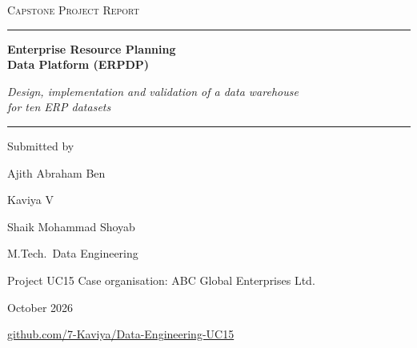 \documentclass[12pt,a4paper]{report}
\newcommand{\institution}{}
\newcommand{\guide}{}
\newcommand{\reportdate}{October 2026}
\begin{document}
\begin{titlepage}
\centering
\ifdefempty{\institution}{\vspace*{1.2cm}}{{\Large\scshape\institution\par}\vspace{1.2cm}}
{\large\scshape Capstone Project Report\par}
\vspace{0.35cm}
{\color{brand}\rule{0.38\linewidth}{0.8pt}}\par
\vspace{1.9cm}
{\fontsize{27}{33}\selectfont\bfseries Enterprise Resource Planning\\[0.15cm] Data Platform (ERPDP)\par}
\vspace{0.8cm}
{\Large\itshape Design, implementation and validation of a data warehouse\\ for ten ERP datasets\par}
\vspace{2.0cm}
{\color{brand}\rule{0.38\linewidth}{0.8pt}}\par
\vspace{1.2cm}
{\normalsize Submitted by\par}
\vspace{0.4cm}
{\large Ajith Abraham Ben\par}
{\large Kaviya V\par}
{\large Shaik Mohammad Shoyab\par}
\ifdefempty{\guide}{}{\vspace{0.9cm}{\normalsize Under the guidance of\par}\vspace{0.3cm}{\large\guide\par}}
\vfill
{\normalsize M.Tech.\ Data Engineering\par}
\vspace{0.15cm}
{\normalsize Project UC15 \textperiodcentered{} Case organisation: ABC Global Enterprises Ltd.\par}
\vspace{0.15cm}
{\normalsize\reportdate\par}
\vspace{0.7cm}
{\small\color{brand}\href{https://github.com/7-Kaviya/Data-Engineering-UC15}{github.com/7-Kaviya/Data-Engineering-UC15}\par}
\end{titlepage}

\setcounter{page}{1}
\end{document}
